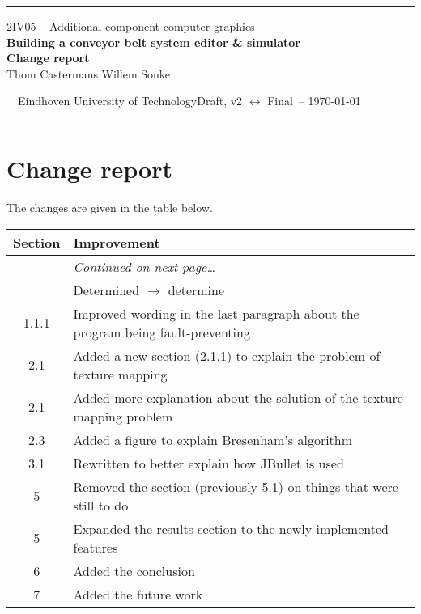 \documentclass[a4paper,10pt]{article}
\newcommand*{\accgtitle}{Building a conveyor belt system editor \& simulator\\Change report\xspace}
\newcommand*{\accgversion}{Draft, v2 $\leftrightarrow$ Final\xspace}
\begin{document}
\begin{adjustwidth}{0.05\textwidth}{0.05\textwidth}  
  \textcolor{accgblue}{\rule{0.9\textwidth}{0.8pt}}
  
  \begin{center}
    \large 2IV05 -- Additional component computer graphics\\
    \Large\textbf{\accgtitle}\\[10pt]
    \normalsize Thom Castermans \qquad Willem Sonke
  \end{center}
  
  \vspace{10pt}\noindent\footnotesize~~Eindhoven University of Technology\hfill\accgversion\ -- \today~~
  
  \vspace{-6pt}\noindent\textcolor{accgblue}{\rule{0.9\textwidth}{0.8pt}}
\end{adjustwidth}

\begin{abstract}
 This document details the changes between the second draft version of the report and the final version.
\end{abstract}

\section*{Change report}
The changes are given in the table below.

\begin{longtabu}{cX<{\strut}}
  \toprule
  \textbf{Section} & \textbf{Improvement} \\
  \midrule
  \endhead
  \bottomrule
  & \vspace*{-5pt}\hfill\textit{Continued on next page\ldots} \\
  \endfoot
  \bottomrule
   & Determined $\rightarrow$ determine \\
  1.1.1 & Improved wording in the last paragraph about the program being fault-preventing \\
  2.1 & Added a new section (2.1.1) to explain the problem of texture mapping \\
  2.1 & Added more explanation about the solution of the texture mapping problem \\
  2.3 & Added a figure to explain Bresenham's algorithm \\
  3.1 & Rewritten to better explain how JBullet is used \\
  5 & Removed the section (previously 5.1) on things that were still to do \\
  5 & Expanded the results section to the newly implemented features \\
  6 & Added the conclusion \\
  7 & Added the future work \\
\end{longtabu}
\end{document}
